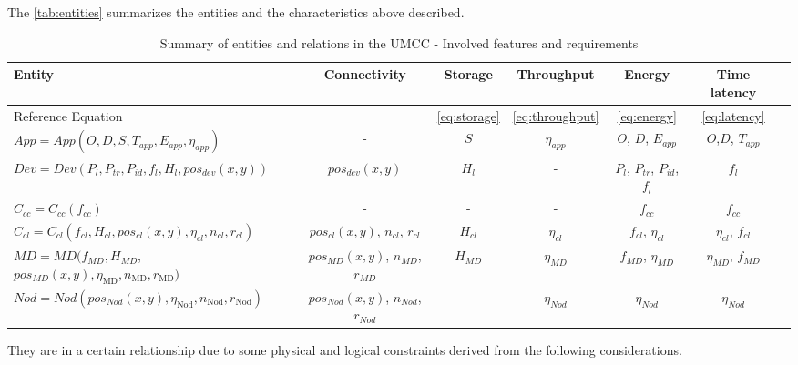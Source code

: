 \documentclass[twoside,openright]{report}
\begin{document}
The \autoref{tab:entities} summarizes the entities and the characteristics above described. 
\begin{sidewaystable}[tbp]
\renewcommand{\arraystretch}{2}
\begin{center}
\caption{Summary of entities and relations in the UMCC - Involved features and requirements}
\label{tab:entities}
{\begin{tabular}{l||c|c|c|c|cl}
Entity     & Connectivity	& Storage & Throughput & Energy	& Time latency 	\\  \hline
Reference Equation     &  	& \ref{eq:storage} & \ref{eq:throughput} & \ref{eq:energy}	& \ref{eq:latency} 	\\  \hline

$App = App(O,D,S,T_\textit{app},E_\textit{app},\eta_\textit{app})$		        & - 						& $S$ &	 $\eta_\textit{app}$ & $O$, $D$, $E_\textit{app}$					& $O$,$D$, $T_\textit{app}$		\\ 
$Dev = Dev(P_l, P_{\textit{tr}}, P_{\textit{id}}, f_{\textit{l}}, H_{l}, pos_{\textit{dev}}(x, y))$			& $pos_{\textit{dev}}(x, y)$	& $H_l$	&	-	& $P_l$, $P_\textit{tr}$, $P_\textit{id}$, $f_l$		& $f_l$				\\ 
$C_{\textit{cc}} = C_{\textit{cc}}(f_{\textit{cc}})$		& -			  				& -		&  - & $f_\textit{cc}$							& $f_\textit{cc}$				\\
$C_{\textit{cl}} = C_{\textit{cl}}(f_{\textit{cl}}, H_{\textit{cl}},  pos_{\textit{cl}}(x, y), \eta_{\textit{cl}}, n_\textit{cl}, r_{\textit{cl}})$		& $pos_{\textit{cl}}(x, y)$, $n_\textit{cl}$, $r_\textit{cl}$		& $H_\textit{cl}$ &	$\eta_\textit{cl}$ & $f_\textit{cl}$, $\eta_\textit{cl}$		& $\eta_\textit{cl}$, $f_\textit{cl}$		\\ 
$\textit{MD} = \textit{MD}( f_{\textit{MD}}, H_{\textit{MD}}$,$pos_{\textit{MD}}(x, y), \eta_{\text{MD}} ,  n_{\text{MD}},  r_{\text{MD}} )$		& $pos_{\textit{MD}}(x, y)$, $n_\textit{MD}$, $r_\textit{MD}$		& $H_\textit{MD}$ 	  &	$\eta_\textit{MD}$	& $f_\textit{MD}$, $\eta_\textit{MD}$	& $\eta_\textit{MD}$, $f_\textit{MD}$	\\ 
$\textit{Nod} = \textit{Nod}(pos_{\textit{Nod}}(x, y), \eta_{\text{Nod}} ,  n_{\text{Nod}},  r_{\text{Nod}})$		& $pos_{\textit{Nod}}(x, y)$, $n_\textit{Nod}$, $r_\textit{Nod}$	 		& -		&$\eta_\textit{Nod}$	& $\eta_\textit{Nod}$ 		& $\eta_\textit{Nod}$			\\ \hline
\end{tabular}}
\end{center}
\end{sidewaystable}
They are in a certain relationship due to some physical and logical constraints derived from the following considerations. 
\end{document}
